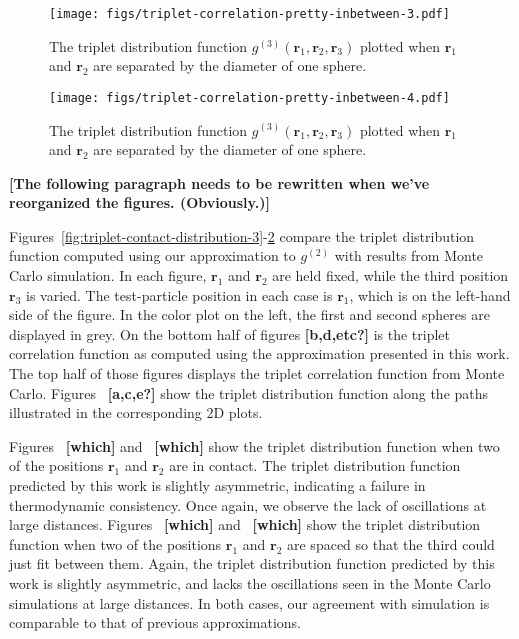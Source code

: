 \documentclass[letterpaper,twocolumn,amsmath,amssymb,pre,aps,10pt]{revtex4-1}
\newcommand{\red}[1]{{\bf \color{red} #1}}
\newcommand{\rr}{\textbf{r}}
\newcommand{\fixme}[1]{\red{[#1]}}
\begin{document}
\begin{figure}
  \texttt{[image: figs/triplet-correlation-pretty-inbetween-3.pdf]}
  \caption{The triplet distribution function
    $g^{(3)}(\rr_1,\rr_2,\rr_3)$ plotted when $\rr_1$ and $\rr_2$ are
    separated by the diameter of one sphere.}\label{fig:triplet-inbetween-distribution-3}
\end{figure}
\begin{figure}
  \texttt{[image: figs/triplet-correlation-pretty-inbetween-4.pdf]}
  \caption{The triplet distribution function
    $g^{(3)}(\rr_1,\rr_2,\rr_3)$ plotted when $\rr_1$ and $\rr_2$ are
    separated by the diameter of one sphere.}\label{fig:triplet-inbetween-distribution-4}
\end{figure}

\fixme{The following paragraph needs to be rewritten when we've
  reorganized the figures. (Obviously.)}

Figures~\ref{fig:triplet-contact-distribution-3}-\ref{fig:triplet-inbetween-distribution-4}
compare the triplet distribution function computed using our
approximation to $g^{(2)}$ with results from Monte Carlo simulation.
In each figure, $\rr_1$ and $\rr_2$ are held fixed, while the third
position $\rr_3$ is varied.  The test-particle position in each case
is $\rr_1$, which is on the left-hand side of the figure.  In the
color plot on the left, the first and second spheres are displayed in
grey.  On the bottom half of figures \fixme{b,d,etc?} is the triplet
correlation function as computed using the approximation presented in
this work.  The top half of those figures displays the triplet
correlation function from Monte Carlo.  Figures~\fixme{a,c,e?} show
the triplet distribution function along the paths illustrated in the
corresponding 2D plots.

Figures~\fixme{which} and~\fixme{which} show the triplet distribution
function when two of the positions $\rr_1$ and $\rr_2$ are in contact.
The triplet distribution function predicted by this work is slightly
asymmetric, indicating a failure in thermodynamic consistency.  Once
again, we observe the lack of oscillations at large distances.
Figures~\fixme{which} and~\fixme{which} show the triplet distribution
function when two of the positions $\rr_1$ and $\rr_2$ are spaced so
that the third could just fit between them.  Again, the triplet
distribution function predicted by this work is slightly asymmetric,
and lacks the oscillations seen in the Monte Carlo simulations at
large distances.  In both cases, our agreement with simulation is
comparable to that of previous approximations.
\end{document}
